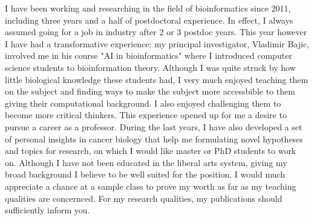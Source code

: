 \documentclass[11pt, a4paper]{awesome-cv}
\begin{document}
\begin{cvletter}
   I have been working and researching in the
  field of bioinformatics since 2011, including three years and a half
  of postdoctoral experience. In effect, I always assumed going for a
  job in industry after 2 or 3 postdoc years. This year however I have
  had a transformative experience: my principal investigator, Vladimir
  Bajic, involved me in his course "AI in bioinformatics" where I
  introduced computer science students to bioinformation
  theory. Although I was quite struck by how little biological
  knowledge these students had, I very much enjoyed teaching them on
  the subject and finding ways to make the subject more accessbible to
  them giving their computational background. I also enjoyed
  challenging them to become more critical thinkers. This experience
  opened up for me a desire to pursue a career as a professor.  During
  the last years, I have also developed a set of personal insights in
  cancer biology that help me formulating novel hypotheses and topics
  for research, on which I would like master or PhD students to work
  on. Although I have not been educated in the liberal arts system,
  giving my broad background I believe to be well suited for the
  position. I would much appreciate a chance at a sample class to
  prove my worth as far as my teaching qualities are concernced. For
  my research qualities, my publications should sufficiently inform
  you.

\end{cvletter}


\makeletterclosing
\end{document}
